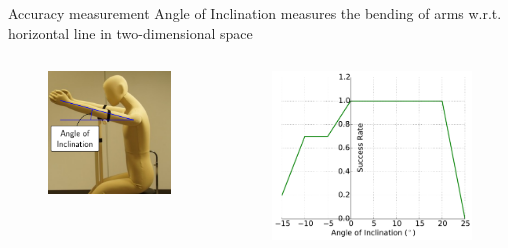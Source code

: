\documentclass[aspectratio=43,11pt,xcolor={dvipsnames}]{beamer}
\begin{document}
\begin{frame}{Accuracy measurement}
	Angle of Inclination measures the bending of arms w.r.t. horizontal line in two-dimensional space
	\begin{columns}[t]
		\begin{column}{0.4\textwidth}
			\begin{figure}
				\includegraphics[width=\textwidth]{inclination_plus}
			\end{figure}
		\end{column}
						
		\begin{column}{0.5\textwidth}
			\begin{figure}
				\includegraphics[width=\textwidth]{success_rate}
			\end{figure}
		\end{column}
	\end{columns}
\end{frame}
\end{document}
